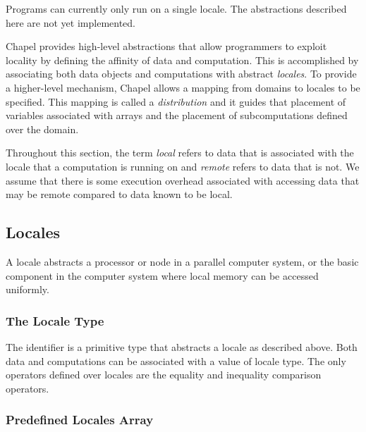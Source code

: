 \label{Locality_and_Distribution}

\begin{implementation}
Programs can currently only run on a single locale.  The abstractions
described here are not yet implemented.
\end{implementation}

Chapel provides high-level abstractions that allow programmers to
exploit locality by defining the affinity of data and computation.
This is accomplished by associating both data objects and computations
with abstract {\em locales}. To provide a higher-level mechanism,
Chapel allows a mapping from domains to locales to be specified. This
mapping is called a {\em distribution} and it guides that placement of
variables associated with arrays and the placement of subcomputations
defined over the domain.

Throughout this section, the term {\em local} refers to data that is
associated with the locale that a computation is running on and {\em
remote} refers to data that is not. We assume that there is some
execution overhead associated with accessing data that may be remote
compared to data known to be local.

\subsection{Locales}
\label{Locales}

A locale abstracts a processor or node in a parallel computer system,
or the basic component in the computer system where local memory can
be accessed uniformly.

\subsubsection{The Locale Type}
\label{The_Locale_Type}

The identifier  is a primitive type that abstracts a
locale as described above.  Both data and computations can be
associated with a value of locale type. The only operators defined
over locales are the equality and inequality comparison operators.

\subsubsection{Predefined Locales Array}
\label{Predefined_Locales_Array}


